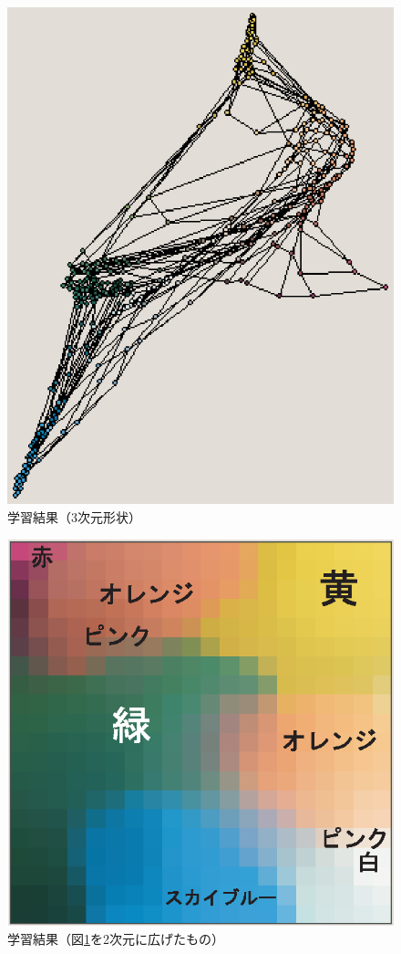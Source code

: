 \documentclass[a4paper,11pt]{jarticle}
\begin{document}
\begin{minipage}{21em}
\begin{figure}[H]
	\begin{center}
	\includegraphics[width=0.8\linewidth]{Fig/3dsom.eps}
	\caption{学習結果（3次元形状）}
	\label{fig:3d}
	\end{center}
\end{figure}
\end{minipage}
\begin{minipage}{21em}
\begin{figure}[H]
	\begin{center}
	\includegraphics[width=0.99\linewidth]{Fig/2dsom.eps}
	\caption{学習結果（図\ref{fig:3d}を2次元に広げたもの）}
	\label{fig:2d}
	\end{center}
\end{figure}
\end{minipage}
\end{document}
